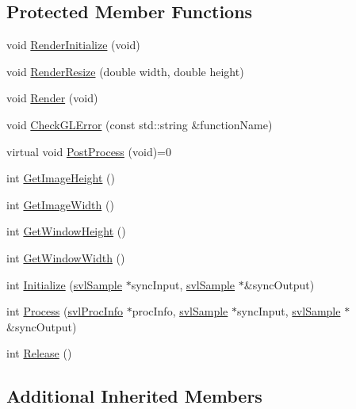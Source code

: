 \subsection*{Protected Member Functions}
\begin{DoxyCompactItemize}
\item 
void \hyperlink{classsvl_filter_image_open_g_l_aa966bc6dbbc3f03b2d17c19d7645f60e}{Render\-Initialize} (void)
\item 
void \hyperlink{classsvl_filter_image_open_g_l_aedadec97f214083356d1cffdbeffedc5}{Render\-Resize} (double width, double height)
\item 
void \hyperlink{classsvl_filter_image_open_g_l_a197bed731e8abb3f10814e2604e8a1ce}{Render} (void)
\item 
void \hyperlink{classsvl_filter_image_open_g_l_a9d0318930ecd6989962f7886ecdd9b76}{Check\-G\-L\-Error} (const std\-::string \&function\-Name)
\item 
virtual void \hyperlink{classsvl_filter_image_open_g_l_ab3a0a1412515c7eb2e9237d529409f2d}{Post\-Process} (void)=0
\item 
int \hyperlink{classsvl_filter_image_open_g_l_a89f8dd6d8f06e092dd938ca055ea8fba}{Get\-Image\-Height} ()
\item 
int \hyperlink{classsvl_filter_image_open_g_l_ac5004073dc9d75c0b24c6c7c4de24f5a}{Get\-Image\-Width} ()
\item 
int \hyperlink{classsvl_filter_image_open_g_l_ab26c807e12ac0976914d283e87048a17}{Get\-Window\-Height} ()
\item 
int \hyperlink{classsvl_filter_image_open_g_l_abdde1baa9b8c4792cc0505962b49b2fa}{Get\-Window\-Width} ()
\item 
int \hyperlink{classsvl_filter_image_open_g_l_a51d341db058fc64c36ab57f71aa8efb3}{Initialize} (\hyperlink{classsvl_sample}{svl\-Sample} $\ast$sync\-Input, \hyperlink{classsvl_sample}{svl\-Sample} $\ast$\&sync\-Output)
\item 
int \hyperlink{classsvl_filter_image_open_g_l_aaa30347e6f0498b314bc33d55bc98e44}{Process} (\hyperlink{structsvl_proc_info}{svl\-Proc\-Info} $\ast$proc\-Info, \hyperlink{classsvl_sample}{svl\-Sample} $\ast$sync\-Input, \hyperlink{classsvl_sample}{svl\-Sample} $\ast$\&sync\-Output)
\item 
int \hyperlink{classsvl_filter_image_open_g_l_a8d5472a0943b0c1b027becfcee030f12}{Release} ()
\end{DoxyCompactItemize}
\subsection*{Additional Inherited Members}



